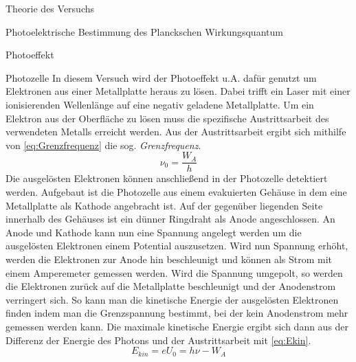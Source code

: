\documentclass[pdftex, a4paper,11pt, twoside, ngerman]{report}
\begin{document}
\begin{chapter}{Theorie des Versuchs}
\begin{section}{Photoelektrische Bestimmung des Planckschen Wirkungsquantum}
\begin{subsection}{Photoeffekt}
      \end{subsection}
      
      
      
      \begin{subsection}{Photozelle}
	\label{chp:TheoriePhotoelektrischesWirkungsquantumPhotozelle}
	In diesem Versuch wird der Photoeffekt u.A. dafür genutzt um Elektronen aus einer Metallplatte heraus zu lösen. Dabei trifft ein Laser mit einer ionisierenden Wellenlänge auf eine negativ geladene Metallplatte. Um ein Elektron aus der Oberfläche zu lösen muss die spezifische Austrittsarbeit des verwendeten Metalls erreicht werden. Aus der Austrittsarbeit ergibt sich mithilfe von \cref{eq:Grenzfrequenz} die sog. \textit{Grenzfrequenz}.
	\begin{equation}
	  \label{eq:Grenzfrequenz}
	  \nu_{0}=\frac{W_{A}}{h}
	\end{equation}
	Die ausgelösten Elektronen können anschließend in der Photozelle detektiert werden. Aufgebaut ist die Photozelle aus einem evakuierten Gehäuse in dem eine Metallplatte als Kathode angebracht ist. Auf der gegenüber liegenden Seite innerhalb des Gehäuses ist ein dünner Ringdraht als Anode angeschlossen. An Anode und Kathode kann nun eine Spannung angelegt werden um die ausgelösten Elektronen einem Potential auszusetzen. Wird nun Spannung erhöht, werden die Elektronen zur Anode hin beschleunigt und können als Strom mit einem Amperemeter gemessen werden. Wird die Spannung umgepolt, so werden die Elektronen zurück auf die Metallplatte beschleunigt und der Anodenstrom verringert sich. So kann man die kinetische Energie der ausgelösten Elektronen finden indem man die Grenzspannung bestimmt, bei der kein Anodenstrom mehr gemessen werden kann. Die maximale kinetische Energie ergibt sich dann aus der Differenz der Energie des Photons und der Austrittsarbeit mit \cref{eq:Ekin}.
	\begin{equation}
	  \label{eq:Ekin}
	  E_{kin}=eU_{0}=h\nu-W_{A}
	\end{equation}
	

\end{subsection}
\end{section}
\end{chapter}
\end{document}
